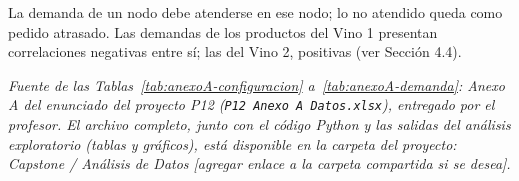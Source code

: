 La demanda de un nodo debe atenderse en ese nodo; lo no atendido queda como
pedido atrasado. Las demandas de los productos del Vino 1 presentan
correlaciones negativas entre sí; las del Vino 2, positivas (ver Sección 4.4).

\bigskip
\noindent\textit{Fuente de las Tablas~\ref{tab:anexoA-configuracion}
a~\ref{tab:anexoA-demanda}: Anexo A del enunciado del proyecto P12
(\texttt{P12 Anexo A Datos.xlsx}), entregado por el profesor. El archivo
completo, junto con el código Python y las salidas del análisis exploratorio
(tablas y gráficos), está disponible en la carpeta del proyecto: Capstone /
Análisis de Datos [agregar enlace a la carpeta compartida si se desea].}

